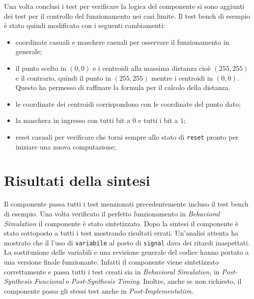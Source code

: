 \documentclass{article}
\begin{document}
	Una volta conclusi i test per verificare la logica del componente si sono aggiunti dei test per il controllo del funzionamento nei casi limite. Il test bench di esempio \`{e} stato quindi modificato con i seguenti cambiamenti:
	\begin{itemize}
		\item coordinate casuali e maschere casuali per osservare il funzionamento in generale;
		\item il punto scelto in $(0,0)$ e i centroidi alla massima distanza cio\`{e} $(255,255)$ e il contrario, quindi il punto in $(255,255)$ mentre i centroidi in $(0,0)$. Questo ha permesso di raffinare la formula per il calcolo della distanza.
		\item le coordinate dei centroidi corrispondono con le coordinate del punto dato;
		\item la maschera in ingresso con tutti bit a $0$ e tutti i bit a $1$;
		\item reset casuali per verificare che torni sempre allo stato di \texttt{reset} pronto per iniziare una nuova computazione;	
	\end{itemize}
	
	
	
	
	\section{Risultati della sintesi}
	Il componente passa tutti i test menzionati precedentemente incluso il test bench di esempio. Una volta verificato il perfetto funzionamento in \textit{Behavioral Simulation} il componente \`{e} stato sintetizzato. Dopo la sintesi il componente \`{e} stato sottoposto a tutti i test mostrando risultati errati. Un'analisi attenta ha mostrato che il l'uso di \texttt{variabile} al posto di \texttt{signal} dava dei ritardi inaspettati. La sostituzione delle variabili e una revisione generale del codice hanno portato a una versione finale funzionante. Infatti il componente viene sintetizzato correttamente e passa tutti i test creati sia in \textit{Behavioral Simulation}, in \textit{Post-Synthesis Funcional} e \textit{Post-Synthesis Timing}. Inoltre, anche se non richiesto, il componente passa gli stessi test anche in \textit{Post-Implementation}.
	
	\pagebreak
	
	
	 
	\pagebreak
	
\end{document}
